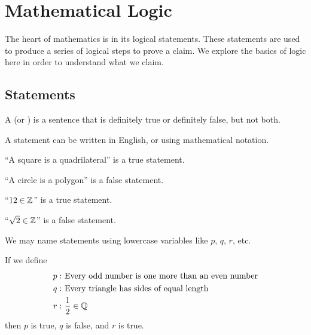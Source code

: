 \chapter{Mathematical Logic}
The heart of mathematics is in its logical statements. These statements are used to produce a series of logical steps to prove a claim. We explore the basics of logic here in order to understand what we claim.

\section{Statements}
\begin{definition}
    A  (or ) is a sentence that is definitely true or definitely false, but not both.
\end{definition}
A statement can be written in English, or using mathematical notation.

\begin{example}
    ``A square is a quadrilateral'' is a true statement.
\end{example}

\begin{example}
    ``A circle is a polygon'' is a false statement.
\end{example}

\begin{example}
    ``$12 \in \mathbb{Z}$'' is a true statement.
\end{example}

\begin{example}
    ``$\sqrt2 \in \mathbb{Z}$'' is a false statement.
\end{example}

We may name statements using lowercase variables like $p$, $q$, $r$, etc.
\begin{example}
    If we define
    \begin{align*}
        p: &\ \text{Every odd number is one more than an even number}\\
        q: &\ \text{Every triangle has sides of equal length}\\
        r: &\ \frac12 \in \mathbb{Q}
    \end{align*}
    then $p$ is true, $q$ is false, and $r$ is true.
\end{example}

